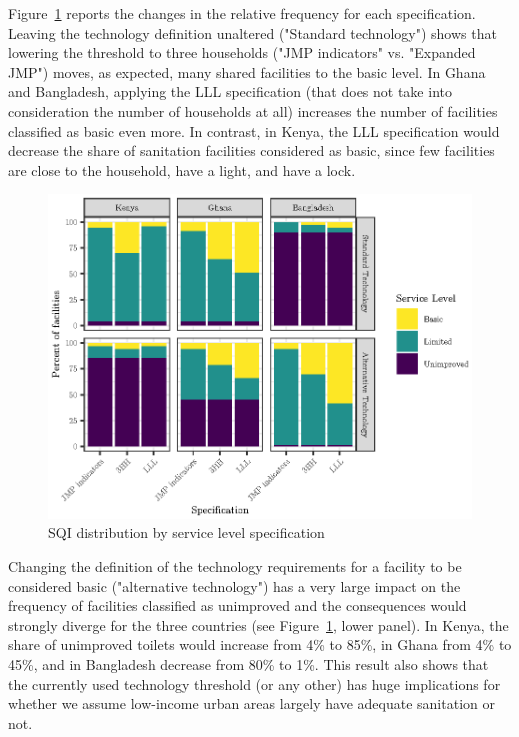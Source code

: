 \documentclass[natbib]{svjour3}                     %
\begin{document}
Figure~\ref{fig:freqlevels} reports the changes in the relative frequency for each specification. Leaving the technology definition unaltered ("Standard technology") shows that lowering the threshold to three households ("JMP indicators" vs. "Expanded JMP") moves, as expected,  many shared facilities to the basic level. In Ghana and Bangladesh, applying the LLL specification (that does not take into consideration the number of households at all) increases the number of facilities classified as basic even more. In contrast, in Kenya, the LLL specification would decrease the share of sanitation facilities considered as basic, since few facilities are close to the household, have a light, and have a lock.

\begin{figure}[htb]
    \centering
    \includegraphics[width=0.99\linewidth]{figures/freqlevels.eps}
    \caption{SQI distribution by service level specification}
    \label{fig:freqlevels}
\end{figure}

Changing the definition of the technology requirements for a facility to be considered basic ("alternative technology") has a very large impact on the frequency of facilities classified as unimproved and the consequences would strongly diverge for the three countries (see Figure~\ref{fig:freqlevels}, lower panel). In Kenya, the share of unimproved toilets would increase from 4\% to 85\%, in Ghana from 4\% to 45\%, and in Bangladesh decrease from 80\% to 1\%. This result also shows that the currently used technology threshold (or any other) has huge implications for whether we assume low-income urban areas largely have adequate sanitation or not. 
\end{document}
